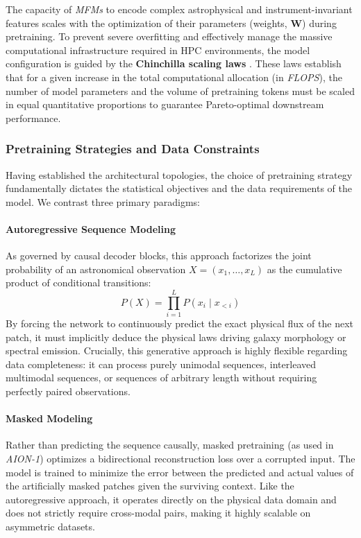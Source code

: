 The capacity of \textit{\glspl{MFM}} to encode complex astrophysical and instrument-invariant features scales with the optimization of their parameters (weights, $\mathbf{W}$) during pretraining. To prevent severe overfitting and effectively manage the massive computational infrastructure required in \gls{HPC} environments, the model configuration is guided by the \textbf{Chinchilla scaling laws} \autocite{ar:hoffmann-2022}. These laws establish that for a given increase in the total computational allocation (in \textit{\gls{FLOPS}}), the number of model parameters and the volume of pretraining tokens must be scaled in equal quantitative proportions to guarantee Pareto-optimal downstream performance.

\subsubsection{Pretraining Strategies and Data Constraints}

Having established the architectural topologies, the choice of pretraining strategy fundamentally dictates the statistical objectives and the data requirements of the model. We contrast three primary paradigms:

\paragraph{Autoregressive Sequence Modeling}
As governed by causal decoder blocks, this approach factorizes the joint probability of an astronomical observation $X = \left(x_1, \dots, x_L\right)$ as the cumulative product of conditional transitions:
\begin{equation}
P\left(X\right) = \prod_{i=1}^{L} P\left(x_i \mid x_{<i}\right)
\label{eq:autoregressive_probability}
\end{equation}
By forcing the network to continuously predict the exact physical flux of the next patch, it must implicitly deduce the physical laws driving galaxy morphology or spectral emission. Crucially, this generative approach is highly flexible regarding data completeness: it can process purely unimodal sequences, interleaved multimodal sequences, or sequences of arbitrary length without requiring perfectly paired observations.

\paragraph{Masked Modeling}
Rather than predicting the sequence causally, masked pretraining (as used in \textit{AION-1}) optimizes a bidirectional reconstruction loss over a corrupted input. The model is trained to minimize the error between the predicted and actual values of the artificially masked patches given the surviving context. Like the autoregressive approach, it operates directly on the physical data domain and does not strictly require cross-modal pairs, making it highly scalable on asymmetric datasets.

